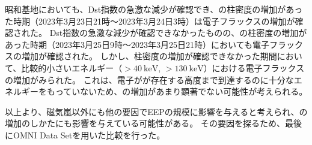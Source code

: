 昭和基地においても、Dst指数の急激な減少が確認でき、の柱密度の増加があった時期（2023年3月23日21時〜2023年3月24日3時）は電子フラックスの増加が確認された。
Dst指数の急激な減少が確認できなかったものの、の柱密度の増加があった時期（2023年3月25日9時〜2023年3月25日21時）においても電子フラックスの増加が確認された。
しかし、柱密度の増加が確認できなかった期間において、比較的小さいエネルギー（$>40\ \mathrm{keV}$, $>130\ \mathrm{keV}$）における電子フラックスの増加がみられた。
これは、電子がが存在する高度まで到達するのに十分なエネルギーをもっていないため、の増加があまり顕著でない可能性が考えられる。
\par

以上より、磁気嵐以外にも他の要因でEEPの規模に影響を与えると考えられ、の増加のしかたにも影響を与えている可能性がある。
その要因を探るため、最後にOMNI Data Setを用いた比較を行った。


